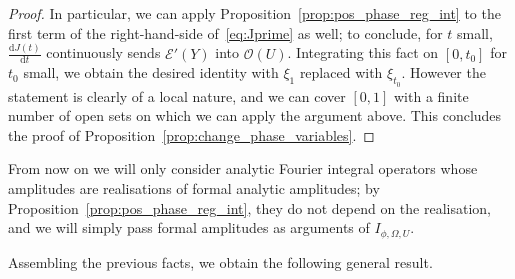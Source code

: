 \documentclass[10pt]{amsart}
\theoremstyle{definition}\newtheorem{defi}[theo]{Definition}\newtheorem{rema}[theo]{Remark}\newtheorem{exam}[theo]{Example}\newtheorem{exem}[theo]{Example}\newtheorem{nota}[theo]{Notation}
\newcommand{\clE}{\mathcal{E}}
\newcommand{\clO}{\mathcal{O}}
\newcommand\1{\mathds{1}}
\newcommand{\dd}{\mathrm{d}}
\begin{document}
\begin{proof}
In particular, we can apply Proposition~\ref{prop:pos_phase_reg_int} to the first term of the right-hand-side of~\eqref{eq:Jprime} as well; to conclude, for $t$ small, $\frac{\dd J(t)}{\dd t}$ continuously sends $\clE'(Y)$ into $\clO(U)$. Integrating this fact on $[0,t_0]$ for $t_0$ small, we obtain the desired identity with $\xi_1$ replaced with $\xi_{t_0}$. However the statement is clearly of a local nature, and we can cover $[0,1]$ with a finite number of open sets on which we can apply the argument above. This concludes the proof of Proposition~\ref{prop:change_phase_variables}.
\end{proof}

From now on we will only consider analytic Fourier integral operators whose amplitudes are realisations of formal analytic amplitudes; by Proposition~\ref{prop:pos_phase_reg_int}, they do not depend on the realisation, and we will simply pass formal amplitudes as arguments of $I_{\phi,\Omega,U}$.

Assembling the previous facts, we obtain the following general result.
\end{document}
